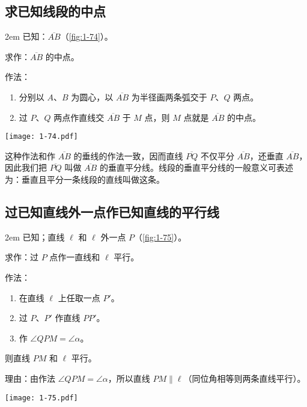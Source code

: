 \subsection{求已知线段的中点}
\noindent
\begin{minipage}{0.65\linewidth}\parindent2em
已知：$\overline{AB}$（\cref{fig:1-74}）。

求作：$\overline{AB}$ 的中点。

作法：
\begin{enumerate}
\item 分别以 $A$、$B$ 为圆心，以 $\overline{AB}$ 为半径画两条弧交于 $P$、$Q$ 两点。
\item 过 $P$、$Q$ 两点作直线交 $\overline{AB}$ 于 $M$ 点，则 $M$ 点就是 $\overline{AB}$ 的中点。
\end{enumerate}

\end{minipage}\hfill
\begin{minipage}{0.3\linewidth}\centering
  \texttt{[image: 1-74.pdf]}
	\label{fig:1-74}
\end{minipage}

\medskip
\begin{rmk}
这种作法和作 $\overline{AB}$ 的垂线的作法一致，因而直线	$\overline{PQ}$ 不仅平分 $\overline{AB}$，还垂直 $\overline{AB}$，因此我们把 $\overline{PQ}$ 叫做 $\overline{AB}$ 的垂直平分线。线段的垂直平分线的一般意义可表述为：垂直且平分一条线段的直线叫做这条。
\end{rmk}

\subsection{过已知直线外一点作已知直线的平行线}
\noindent
\begin{minipage}{0.65\linewidth}\parindent2em
已知；直线 $\ell$ 和 $\ell$ 外一点 $P$（\cref{fig:1-75}）。

求作：过 $P$ 点作一直线和 $\ell$ 平行。

作法：
\begin{enumerate}
\item 在直线 $\ell$ 上任取一点 $P'$。
\item 过 $P$、$P'$ 作直线 $PP'$。
\item 作 $\angle QPM=\angle\alpha$。
\end{enumerate}
则直线 $PM$ 和 $\ell$ 平行。

理由：由作法 $\angle QPM=\angle\alpha$，所以直线 $PM\parallel \ell$（同位角相等则两条直线平行）。
\end{minipage}\hfill
\begin{minipage}{0.3\linewidth}\centering
	\texttt{[image: 1-75.pdf]}
	\label{fig:1-75}
\end{minipage}


